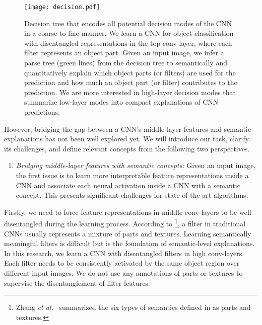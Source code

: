 \documentclass[10pt,twocolumn,letterpaper]{article}
\begin{document}
\begin{figure}[t]
\centering
\texttt{[image: decision.pdf]}
\caption{Decision tree that encodes all potential decision modes of the CNN in a coarse-to-fine manner. We learn a CNN for object classification with disentangled representations in the top conv-layer, where each filter represents an object part. Given an input image, we infer a parse tree (green lines) from the decision tree to semantically and quantitatively explain which object parts (or filters) are used for the prediction and how much an object part (or filter) contributes to the prediction. We are more interested in high-layer decision modes that summarize low-layer modes into compact explanations of CNN predictions.}
\label{fig:decision}
\end{figure}

However, bridging the gap between a CNN's middle-layer features and semantic explanations has not been well explored yet. We will introduce our task, clarify its challenges, and define relevant concepts from the following two perspectives.
\begin{enumerate}
\item[1.] \textit{Bridging middle-layer features with semantic concepts:} Given an input image, the first issue is to learn more interpretable feature representations inside a CNN and associate each neural activation inside a CNN with a semantic concept. This presents significant challenges for state-of-the-art algorithms.
\end{enumerate}
Firstly, we need to force feature representations in middle conv-layers to be well disentangled during the learning process. According to \cite{Interpretability,explanatoryGraph}\footnote[2]{Zhang \emph{et al.}~\cite{interpretableCNN} summarized the six types of semantics defined in \cite{Interpretability} as parts and textures.}, a filter in traditional CNNs usually represents a mixture of parts and textures. Learning semantically meaningful filters is difficult but is the foundation of semantic-level explanations. In this research, we learn a CNN with disentangled filters in high conv-layers. Each filter needs to be consistently activated by the same object region over different input images. We do not use any annotations of parts or textures to supervise the disentanglement of filter features.
\end{document}
